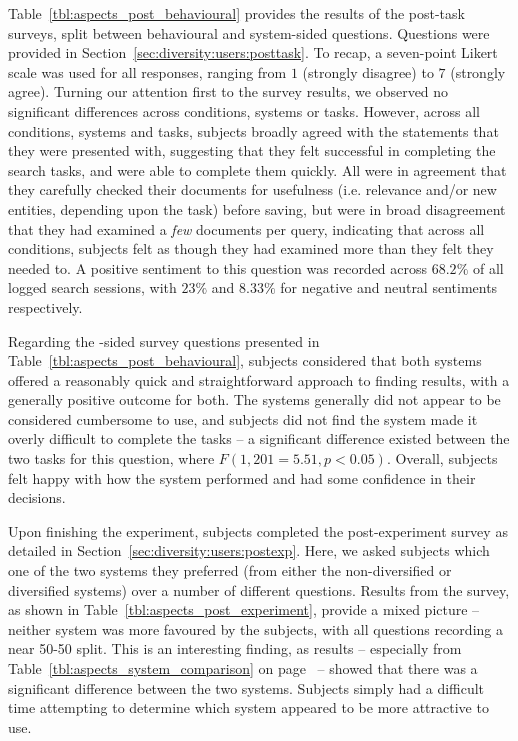  Table~\ref{tbl:aspects_post_behavioural} provides the results of the post-task surveys, split between behavioural and system-sided questions. Questions were provided in Section~\ref{sec:diversity:users:posttask}. To recap, a seven-point Likert scale was used for all responses, ranging from $1$ (strongly disagree) to $7$ (strongly agree). Turning our attention first to the  survey results, we observed no significant differences across conditions, systems or tasks. However, across all conditions, systems and tasks, subjects broadly agreed with the statements that they were presented with, suggesting that they felt successful in completing the search tasks, and were able to complete them quickly. All were in agreement that they carefully checked their documents for usefulness (i.e. relevance and/or new entities, depending upon the task) before saving, but were in broad disagreement that they had examined a \emph{few} documents per query, indicating that across all conditions, subjects felt as though they had examined more than they felt they needed to. A positive sentiment to this question was recorded across $68.2\%$ of all logged search sessions, with $23\%$ and $8.33\%$ for negative and neutral sentiments respectively.

Regarding the -sided survey questions presented in Table~\ref{tbl:aspects_post_behavioural}, subjects considered that both systems offered a reasonably quick and straightforward approach to finding results, with a generally positive outcome for both. The systems generally did not appear to be considered cumbersome to use, and subjects did not find the system made it overly difficult to complete the tasks -- a significant difference existed between the two tasks for this question, where $F(1, 201=5.51, p<0.05)$. Overall, subjects felt happy with how the system performed and had some confidence in their decisions.

Upon finishing the experiment, subjects completed the post-experiment survey as detailed in Section~\ref{sec:diversity:users:postexp}. Here, we asked subjects which one of the two systems they preferred (from either the non-diversified or diversified systems) over a number of different questions. Results from the survey, as shown in Table~\ref{tbl:aspects_post_experiment}, provide a mixed picture -- neither system was more favoured by the subjects, with all questions recording a near 50-50 split. This is an interesting finding, as results -- especially from Table~\ref{tbl:aspects_system_comparison} on page~\pageref{tbl:aspects_system_comparison} -- showed that there was a significant difference between the two systems. Subjects simply had a difficult time attempting to determine which system appeared to be more attractive to use.

